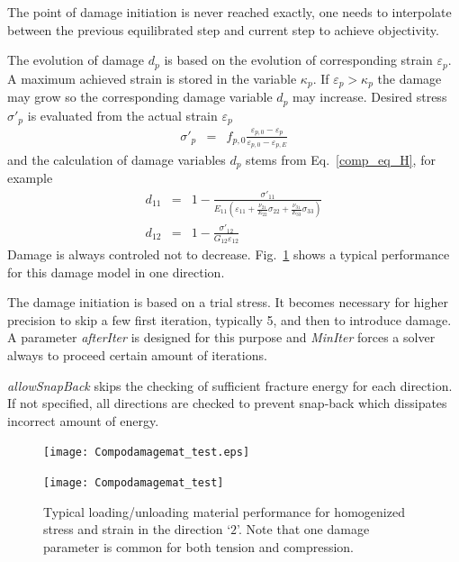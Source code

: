 \documentclass[a4paper]{article}
\newcommand{\param}[1]{{\it #1}}
\begin{document}
The point of damage initiation is never reached exactly, one needs to interpolate between the previous equilibrated step and current step to achieve objectivity.

The evolution of damage $d_p$ is based on the evolution of corresponding strain $\varepsilon_p$. A maximum achieved strain is stored in the variable $\kappa_p$. If $\varepsilon_p > \kappa_p$ the damage may grow so the corresponding damage variable $d_p$ may increase. Desired stress $\sigma'_p$ is evaluated from the actual strain $\varepsilon_p$
\begin{eqnarray}
\sigma'_p &=& f_{p,0} \frac{\varepsilon_{p,0} - \varepsilon_p}{\varepsilon_{p,0}-\varepsilon_{p,E}}
\end{eqnarray}
and the calculation of damage variables $d_p$ stems from Eq.~\ref{comp_eq_H}, for example
\begin{eqnarray}
d_{11} &=& 1 - \frac{\sigma'_{11}}{E_{11}\left(\varepsilon_{11}+\frac{\nu_{21}}{E_{22}}\sigma_{22}+ \frac{\nu_{31}}{E_{33}}\sigma_{33} \right)}\\
d_{12} &=& 1 - \frac{\sigma'_{12}}{G_{12}\varepsilon_{12}}
\end{eqnarray}
Damage is always controled not to decrease. Fig.~\ref{comp_performance} shows a typical performance for this damage model in one direction.

The damage initiation is based on a trial stress. It becomes necessary for  higher precision to skip a few first iteration, typically 5, and then to introduce damage. A parameter \param{afterIter} is designed for this purpose and \param{MinIter} forces a solver always to proceed certain amount of iterations.

\param{allowSnapBack} skips the checking of sufficient fracture energy for each direction. If not specified, all directions are checked to prevent snap-back which dissipates incorrect amount of energy.


\begin{figure}[!htb]
\begin{htmlonly}
  \centerline{\texttt{[image: Compodamagemat\_test.eps]}}
\end{htmlonly}
\centerline{\texttt{[image: Compodamagemat\_test]}}
  \caption{Typical loading/unloading material performance for homogenized stress and strain in the direction `${2}$'. Note that one damage parameter is common for both tension and compression.}
  \label{comp_performance}
\end{figure}
\end{document}
